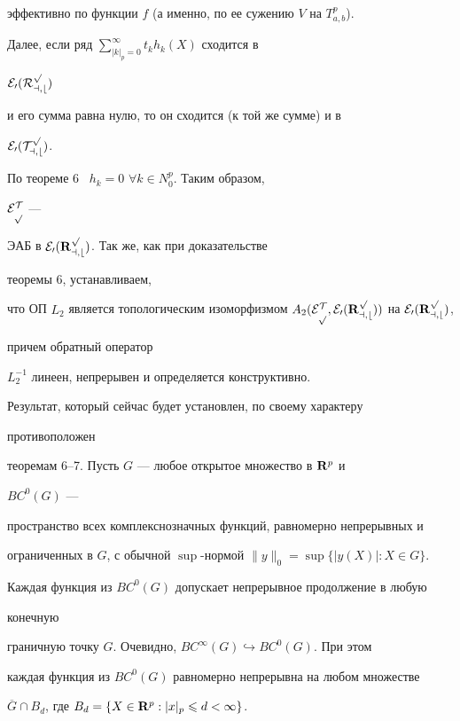эффективно по функции $f$ (а именно, по ее сужению $V$ на $T^p_{a,b}$).


Далее, если ряд $\sum\limits_{|k|_p=0}^{\infty}t_kh_k(X)$ сходится в


$\cal{E}_0(R_{a,b}^p)$


и его сумма равна нулю, то он сходится (к той же сумме) и в


$\cal{E}_0(T_{a,b}^p)$.


По теореме 6 \ $h_k=0$ $\forall k\in N_0^p$. Таким образом,


$\cal{E}_p^T$ ---


ЭАБ в $\cal{E}_0({\bold R}^p_{a,b})$. Так же, как при доказательстве


теоремы 6, устанавливаем,


что ОП $L_2$ является топологическим изоморфизмом $A_2(\cal{E}_p^T,


\cal{E}_0({\bold R}^p_{a,b}))$  на $\cal{E}_0({\bold R}^p_{a,b})$,


причем обратный оператор


$L_2^{-1}$ линеен, непрерывен и определяется конструктивно.





Результат, который сейчас будет установлен, по своему характеру


противоположен


теоремам 6--7. Пусть $G$ --- любое открытое множество в ${\bold R}^p$ и


$BC^0(G)$ ---


пространство всех комплекснозначных функций, равномерно непрерывных и


ограниченных в $G$, с обычной $\sup$-нормой $\|y\|_0=\sup\{|y(X)|: X\in


G\}$.


Каждая функция из $BC^0(G)$ допускает непрерывное продолжение в любую


конечную


граничную точку $G$. Очевидно, $BC^{\infty}(G)\hookrightarrow


BC^0(G)$. При этом


каждая функция из $BC^0(G)$ равномерно непрерывна на любом множестве


$\overline


G\cap B_d$, где $B_d=\{X\in {\bold R}^p: |x|_p\leqslant d<\infty\}$.








